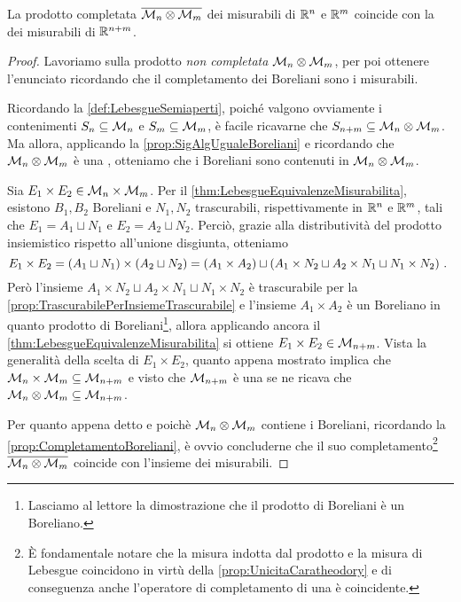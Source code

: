 \begin{proposition}\label{prop:MisuraProdottoEuclidea}
	La \sigalg{} prodotto completata $\overline{\mathcal M_n\otimes\mathcal M_m}$ dei misurabili di $\mathbb R^n$ e $\mathbb R^m$ coincide con la \sigalg{} dei misurabili di $\mathbb R^{n+m}$.
\end{proposition}
\begin{proof}
	Lavoriamo sulla \sigalg{} prodotto \emph{non completata} $\mathcal M_n\otimes\mathcal M_m$, per poi ottenere l'enunciato ricordando che il completamento dei Boreliani sono i misurabili.

	Ricordando la \cref{def:LebesgueSemiaperti}, poiché valgono ovviamente i contenimenti $S_n\subseteq \mathcal M_n$ e $S_m\subseteq \mathcal M_m$, è facile ricavarne che $S_{n+m}\subseteq \mathcal M_n\otimes \mathcal M_m$.
	Ma allora, applicando la \cref{prop:SigAlgUgualeBoreliani} e ricordando che $\mathcal M_n\otimes \mathcal M_m$ è una \sigalg{}, otteniamo che i Boreliani sono contenuti in $\mathcal M_n\otimes\mathcal M_m$.
	
	Sia $E_1\times E_2\in \mathcal M_n\times\mathcal M_m$. Per il \cref{thm:LebesgueEquivalenzeMisurabilita}, esistono $B_1,B_2$ Boreliani e $N_1,N_2$ trascurabili, rispettivamente in $\mathbb R^n$ e $\mathbb R^m$, tali che $E_1=A_1\sqcup N_1$ e $E_2=A_2\sqcup N_2$.
	Perciò, grazie alla distributività del prodotto insiemistico rispetto all'unione disgiunta, otteniamo
	\begin{equation*}
		E_1\times E_2=(A_1\sqcup N_1)\times(A_2\sqcup N_2)=\left(A_1\times A_2\right)\sqcup\left(A_1\times N_2\sqcup A_2\times N_1 \sqcup N_1\times N_2\right) \, \text{. }
	\end{equation*}
	Però l'insieme $A_1\times N_2\sqcup A_2\times N_1 \sqcup N_1\times N_2$ è trascurabile per la \cref{prop:TrascurabilePerInsiemeTrascurabile} e l'insieme $A_1\times A_2$ è un Boreliano in quanto prodotto di Boreliani\footnote{Lasciamo al lettore la dimostrazione che il prodotto di Boreliani è un Boreliano.}, allora applicando ancora il \cref{thm:LebesgueEquivalenzeMisurabilita} si ottiene $E_1\times E_2\in\mathcal M_{n+m}$.
	Vista la generalità della scelta di $E_1\times E_2$, quanto appena mostrato implica che $\mathcal M_n\times\mathcal M_m\subseteq \mathcal M_{n+m}$ e visto che $\mathcal M_{n+m}$ è una \sigalg{} se ne ricava che $\mathcal M_n\otimes\mathcal M_m\subseteq \mathcal M_{n+m}$.
	
	Per quanto appena detto e poichè $\mathcal M_n\otimes\mathcal M_m$ contiene i Boreliani, ricordando la \cref{prop:CompletamentoBoreliani}, è ovvio concluderne che il suo completamento\footnote{È fondamentale notare che la misura indotta dal prodotto e la misura di Lebesgue coincidono in virtù della \cref{prop:UnicitaCaratheodory} e di conseguenza anche l'operatore di completamento di una \sigalg{} è coincidente.} $\overline{\mathcal M_n\otimes\mathcal M_m}$ coincide con l'insieme dei misurabili.
\end{proof}


